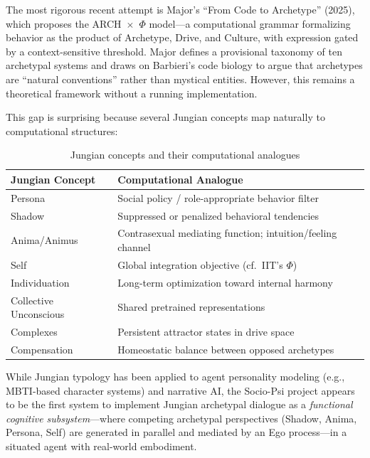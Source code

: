 \documentclass[11pt,letterpaper]{article}
\begin{document}
The most rigorous recent attempt is Major's ``From Code to Archetype''
(2025), which proposes the ARCH~$\times$~$\Phi$ model---a computational
grammar formalizing behavior as the product of Archetype, Drive, and
Culture, with expression gated by a context-sensitive threshold. Major
defines a provisional taxonomy of ten archetypal systems and draws on
Barbieri's code biology to argue that archetypes are ``natural conventions''
rather than mystical entities. However, this remains a theoretical framework
without a running implementation.

This gap is surprising because several Jungian concepts map naturally to
computational structures:

\begin{table}[H]
\centering
\small\sffamily
\caption{Jungian concepts and their computational analogues}
\label{tab:jung-computation}
\begin{tabularx}{\textwidth}{l X}
\toprule
\textbf{Jungian Concept} & \textbf{Computational Analogue} \\
\midrule
Persona & Social policy / role-appropriate behavior filter \\
Shadow & Suppressed or penalized behavioral tendencies \\
Anima/Animus & Contrasexual mediating function; intuition/feeling channel \\
Self & Global integration objective (cf.\ IIT's $\Phi$) \\
Individuation & Long-term optimization toward internal harmony \\
Collective Unconscious & Shared pretrained representations \\
Complexes & Persistent attractor states in drive space \\
Compensation & Homeostatic balance between opposed archetypes \\
\bottomrule
\end{tabularx}
\end{table}

While Jungian typology has been applied to agent personality modeling (e.g.,
MBTI-based character systems) and narrative AI, the Socio-Psi project
appears to be the first system to implement Jungian archetypal dialogue as a
\emph{functional cognitive subsystem}---where competing archetypal
perspectives (Shadow, Anima, Persona, Self) are generated in parallel and
mediated by an Ego process---in a situated agent with real-world embodiment.

\end{document}
